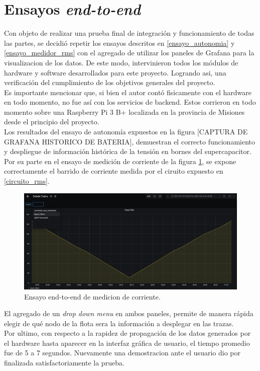 \section{Ensayos \textit{end-to-end}}
Con objeto de realizar una prueba final de integraci\'{o}n y funcionamiento de todas las partes, se decidi\'{o} repetir los ensayos descritos en \ref{ensayo_autonomia} y \ref{ensayo_medidor_rms} con el agregado de utilizar los paneles de Grafana para la visualizacion de los datos. De este modo, intervinieron todos los m\'{o}dulos de hardware y software desarrollados para este proyecto. Logrando asi, una verificaci\'{o}n del cumplimiento de los objetivos generales del proyecto.\\
Es importante mencionar que, si bien el autor cont\'{o} fisicamente con el hardware en todo momento, no fue as\'{i} con los servicios de backend. Estos corrieron en todo momento sobre una Raspberry Pi 3 B+ localizada en la provincia de Misiones desde el principio del proyecto.\\
Los resultados del ensayo de autonomía expuestos en la figura [CAPTURA DE GRAFANA HISTORICO DE BATERIA], demuestran el correcto funcionamiento y despliegue de informaci\'{o}n hist\'{o}rica de la tensión en bornes del supercapacitor.\\
Por su parte en el ensayo de medici\'{o}n de corriente de la figura \ref{fig:capturahistoricodropdown}, se expone correctamente el barrido de corriente medida por el ciruito expuesto en \ref{circuito_rms}.\\

\begin{figure}[h]
	\centering
	\includegraphics[width=1.0\linewidth]{Figures/captura_historico_dropdown}
	\caption{Ensayo end-to-end de medicion de corriente.}
	\label{fig:capturahistoricodropdown}
\end{figure}
El agregado de un \textit{drop down menu} en ambos paneles, permite de manera r\'{a}pida elegir de qu\'{e} nodo de la flota sera la informaci\'{o}n a desplegar en las trazas.\\
Por ultimo, con respecto a la rapidez de propagaci\'{o}n de los datos generados por el hardware hasta aparecer en la interfaz gráfica de usuario, el tiempo promedio fue de 5 a 7 segundos. Nuevamente una demostracion ante el usuario dio por finalizada satisfactoriamente la prueba.